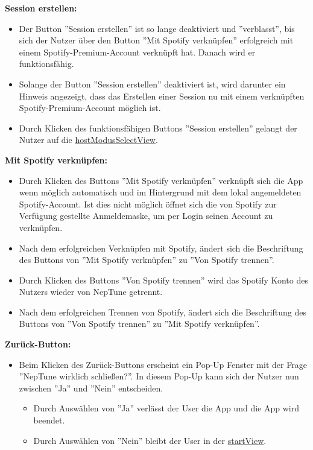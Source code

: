 \documentclass[oneside, ngerman]{sdqtechreport}
\begin{document}
\textbf{Session erstellen:}
\begin{itemize}
    \item Der Button ''Session erstellen'' ist so lange deaktiviert und ''verblasst'', bis sich der Nutzer über den Button ''Mit Spotify verknüpfen'' erfolgreich mit einem Spotify-Premium-Account verknüpft hat. Danach wird er funktionsfähig.
    \item Solange der Button ''Session erstellen'' deaktiviert ist, wird darunter ein Hinweis angezeigt, dass das Erstellen einer Session nu mit einem verknüpften Spotify-Premium-Account möglich ist.
    \item Durch Klicken des funktionsfähigen Buttons ''Session erstellen'' gelangt der Nutzer auf die \hyperlink{hostModusSelectView}{hostModusSelectView}.
\end{itemize}

\textbf{Mit Spotify verknüpfen:}
\begin{itemize}
    \item Durch Klicken des Buttons ''Mit Spotify verknüpfen'' verknüpft sich die App wenn möglich automatisch und im Hintergrund mit dem lokal angemeldeten Spotify-Account. Ist dies nicht möglich öffnet sich die von Spotify zur Verfügung gestellte Anmeldemaske, um per Login seinen Account zu verknüpfen.
    \item Nach dem erfolgreichen Verknüpfen mit Spotify, ändert sich die Beschriftung des Buttons von ''Mit Spotify verknüpfen'' zu ''Von Spotify trennen''.
    \item Durch Klicken des Buttons ''Von Spotify trennen'' wird das Spotify Konto des Nutzers wieder von NepTune getrennt.
    \item Nach dem erfolgreichen Trennen von Spotify, ändert sich die Beschriftung des Buttons von ''Von Spotify trennen'' zu ''Mit Spotify verknüpfen''.
\end{itemize}

\textbf{Zurück-Button:}
\begin{itemize}
    \item Beim Klicken des Zurück-Buttons erscheint ein Pop-Up Fenster mit der Frage ''NepTune wirklich schließen?''. In diesem Pop-Up kann sich der Nutzer nun zwischen ''Ja'' und ''Nein'' entscheiden.
    \begin{itemize}
        \item Durch Auswählen von ''Ja'' verlässt der User die App und die App wird beendet.
        \item Durch Auswählen von ''Nein'' bleibt der User in der \hyperlink{startView}{startView}.
    \end{itemize}
\end{itemize}
\end{document}
